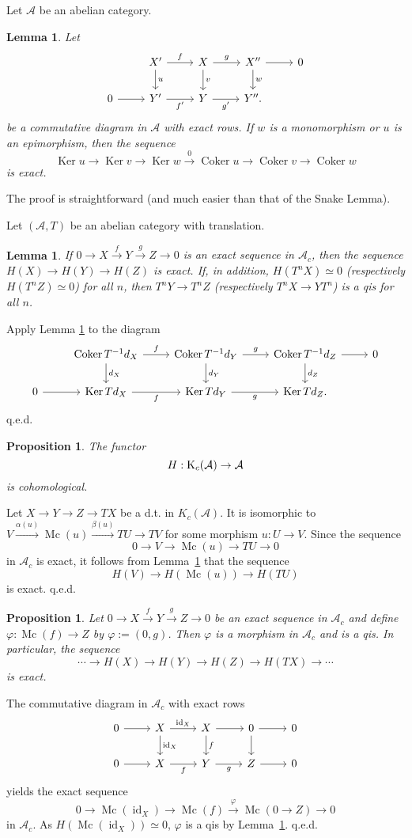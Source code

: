 \documentclass[12pt]{article}
\newtheorem{lem}[thm]{Lemma}
\newtheorem{prop}[thm]{Proposition}
\theoremstyle{remark}%
\newcommand{\n}{\noindent}
\newcommand{\A}{\mathcal A}
\newcommand{\p}{\varphi}
\newcommand{\xr}{\xrightarrow}
\DeclareMathOperator{\Coker}{Coker}
\DeclareMathOperator{\id}{id}
\DeclareMathOperator{\Ker}{Ker}
\DeclareMathOperator{\Mc}{Mc}
\begin{document}
Let $\A$ be an abelian category. 
%
\begin{lem}\label{sl1}
Let  
$$
\begin{tikzcd}
{}&X'\ar{d}{u}\ar{r}{f}&X\ar{d}{v}\ar{r}{g}&X''\ar{d}{w}\ar{r}&0\\ 
0\ar{r}&Y'\ar{r}[swap]{f'}&Y\ar{r}[swap]{g'}&Y''.
\end{tikzcd}
$$ 
be a commutative diagram in $\A$ with exact rows. If $w$ is a monomorphism or $u$ is an epimorphism, then the sequence  
$$
\Ker u\to\Ker v\to\Ker w\xr0\Coker u\to\Coker v\to\Coker w
$$
is exact.
\end{lem}
%
The proof is straightforward (and much easier than that of the Snake Lemma). 

Let $(\A,T)$ be an abelian category with translation. 
%
\begin{lem}\label{sl2}
If $0\to X\xr fY\xr g Z\to0$ is an exact sequence in $\A_c$, then the sequence $H(X)\to H(Y)\to H(Z)$ is exact. If, in addition, $H(T^nX)\simeq0$ (respectively  $H(T^nZ)\simeq0$) for all $n$, then $T^nY\to T^nZ$ (respectively  $T^nX\to YT^n$) is a qis for all $n$. 
\end{lem}
% 
\n{\em Proof.} Apply Lemma \ref{sl1} to the diagram 
$$
\begin{tikzcd}
{}&\Coker T^{-1}d_X\ar{d}{d_X}\ar{r}{f}&\Coker T^{-1}d_Y\ar{d}{d_Y}\ar{r}{g}&\Coker T^{-1}d_Z\ar{d}{d_Z}\ar{r}&0\\ 
0\ar{r}&\Ker Td_X\ar{r}[swap]{f}&\Ker Td_Y\ar{r}[swap]{g}&\Ker Td_Z.
\end{tikzcd}
$$ 
q.e.d. 
%
\begin{prop}\label{sl3}
The functor 
$$
H:\text K_c(\A)\to\A
$$ 
is cohomological. 
\end{prop}
%
\n{\em Proof.} Let $X\to Y\to Z\to TX$ be a d.t. in $K_c(\A)$. It is isomorphic to $V\xr{\alpha(u)}\Mc(u)\xr{\beta(u)}TU\to TV$ for some morphism $u:U\to V$. Since the sequence  
$$
0\to V\to\Mc(u)\to TU\to0
$$ 
in $\A_c$ is exact, it follows from Lemma~\ref{sl2} that the sequence 
$$ 
H(V)\to H(\Mc(u))\to H(TU)
$$ 
is exact. q.e.d.
%
\begin{prop}\label{sl4}
Let $0\to X\xr f Y\xr g Z\to0$ be an exact sequence in $\A_c$ and define $\p:\Mc(f)\to Z$ by $\p:=(0,g)$. Then $\p$ is a morphism in $\A_c$ and is a qis. In particular, the sequence 
$$
\cdots\to H(X)\to H(Y)\to H(Z)\to H(TX)\to\cdots
$$
is exact.
\end{prop}
%
\n{\em Proof.} The commutative diagram in $\A_c$ with exact rows 
$$
\begin{tikzcd}
0\ar{r}&X\ar{d}{\id_X}\ar{r}{\id_X}&X\ar{d}{f}\ar{r}&0\ar{d}\ar{r}&0\\ 
0\ar{r}&X\ar{r}[swap]{f}&Y\ar{r}[swap]{g}&Z\ar{r}&0
\end{tikzcd}
$$ 
yields the exact sequence 
$$
0\to\Mc(\id_X)\to\Mc(f)\xr\p\Mc(0\to Z)\to0
$$
in $\A_c$. As $H(\Mc(\id_X))\simeq0$, $\p$ is a qis by Lemma~\ref{sl2}. q.e.d.
%
\end{document}
